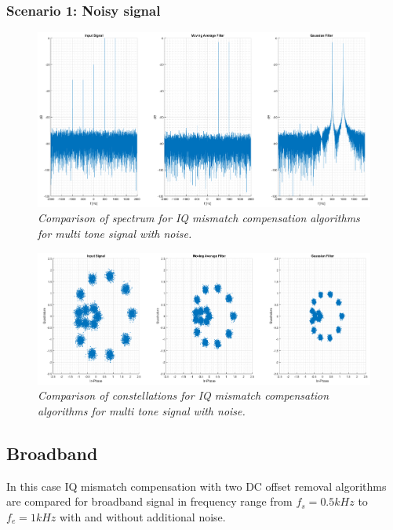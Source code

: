 \documentclass[en,printmode]{mgr}
\begin{document}
		\subsubsection*{Scenario 1: Noisy signal}
			\vspace{1cm}
			\begin{figure}[H]
    			\centering
   				\includegraphics[width=\textwidth]{plots/multi_nf.png}
   		 		\caption{\textit{Comparison of spectrum for IQ mismatch compensation algorithms for 
   		 		multi tone signal with noise.}}
   		 	\end{figure}
   		 	\vspace{2cm}	
   		 	\begin{figure}[H]
    			\centering
   				\includegraphics[width=\textwidth]{plots/multi_nc.png}
   		 		\caption{\textit{Comparison of constellations for IQ mismatch compensation algorithms 
   		 		for multi tone signal with noise.}}
   		 	\end{figure}
   	\newpage
	\subsection*{Broadband}
		In this case IQ mismatch compensation with two DC offset removal algorithms are compared for
		broadband signal in frequency range from $f_s=0.5kHz$ to $f_e=1kHz$ with and without additional
		noise.
\end{document}
